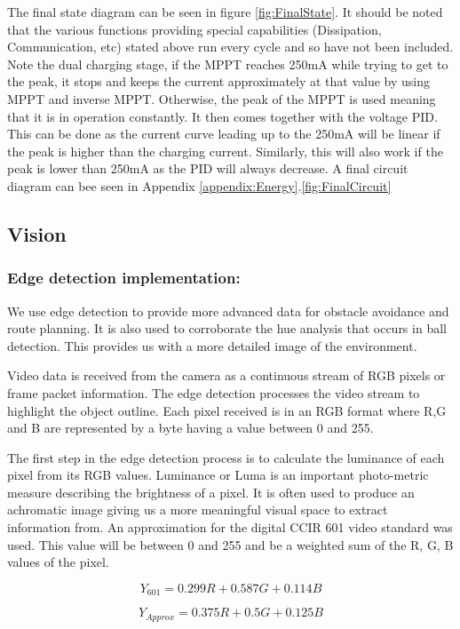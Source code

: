 \documentclass[10pt,twoside]{article}
\begin{document}
The final state diagram can be seen in figure \ref{fig:FinalState}. It should be noted that the various functions providing special capabilities (Dissipation, Communication, etc) stated above run every cycle and so have not been included. Note the dual charging stage, if the MPPT reaches 250mA while trying to get to the peak, it stops and keeps the current approximately at that value by using MPPT and inverse MPPT. Otherwise, the peak of the MPPT is used meaning that it is in operation constantly. It then comes together with the voltage PID. This can be done as the current curve leading up to the 250mA will be linear if the peak is higher than the charging current. Similarly, this will also work if the peak is lower than 250mA as the PID will always decrease. A final circuit diagram can bee seen in Appendix \ref{appendix:Energy}.\ref{fig:FinalCircuit}


\subsection{Vision}

\subsubsection{Edge detection implementation:}

We use edge detection to provide more advanced data for obstacle avoidance and route planning. It is also used to corroborate the hue analysis that occurs in ball detection. This provides us with a more detailed image of the environment. 

Video data is received from the camera as a continuous stream of RGB pixels or frame packet information. The edge detection processes the video stream to highlight the object outline. Each pixel received is in an RGB format where R,G and B are represented by a byte having a value between 0 and 255. 

The first step in the edge detection process is to calculate the luminance of each pixel from its RGB values. Luminance or Luma is an important photo-metric measure describing the brightness of a pixel. It is often used to produce an achromatic image giving us a more meaningful visual space to extract information from. An approximation for the digital CCIR 601 \cite{LumaWikipedia} video standard was used. This value will be between 0 and 255 and be a weighted sum of the R, G, B values of the pixel. 

\begin{minipage}{.49\textwidth}
\begin{equation}
    Y_{601} = 0.299R + 0.587G + 0.114B
\end{equation}
\end{minipage}
\begin{minipage}{.49\textwidth}
\begin{equation}
    Y_{Approx} = 0.375R + 0.5G + 0.125B
\end{equation}
\end{minipage}
\end{document}
